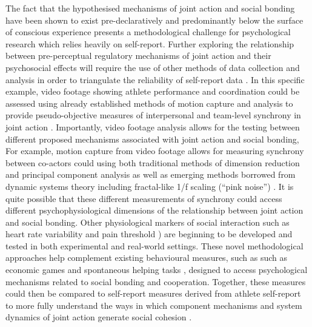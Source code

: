 \begin{landscape}
  The fact that the hypothesised mechanisms of joint action and social bonding have been shown to exist pre-declaratively and predominantly below the surface of conscious experience presents a methodological challenge for psychological research which relies heavily on self-report.  Further exploring the relationship between pre-perceptual regulatory mechanisms of joint action and their psychosocial effects will require the use of other methods of data collection and analysis in order to triangulate the reliability of self-report data \citep{Newell2014}.  In this specific example, video footage showing athlete performance and coordination could be assessed using already established methods of motion capture and analysis to provide pseudo-objective measures of interpersonal and team-level synchrony in joint action \citep[e.g.][]{Passos2011}.
  Importantly, video footage analysis allows for the testing between different proposed mechanisms associated with joint action and social bonding,  For example, motion capture from video footage allows for measuring synchrony between co-actors could using both traditional methods of dimension reduction and principal component analysis \citep[see for example][]{Riley2011} as well as emerging methods borrowed from dynamic systems theory including fractal-like 1/f scaling (``pink noise'') \citep[see for example][]{Holden2013}. It is quite possible that these different measurements of synchrony could access different psychophysiological dimensions of the relationship between joint action and social bonding.  Other physiological markers of social interaction such as heart rate variability \citep{Konvalinka2011,Fischer2014a} and pain threshold \citep{Cohen2009,Tarr2015}) are beginning to be developed and tested in both experimental and real-world settings.
  These novel methodological approaches help complement existing behavioural measures, such as such as economic games \citep{Xygalatas2013} and spontaneous helping tasks \citep{Kirschner2010}, designed to access psychological mechanisms related to social bonding and cooperation.
  Together, these measures could then be compared to self-report measures derived from athlete self-report to more fully understand the ways in which component mechanisms and system dynamics of joint action generate social cohesion \citep{Marsh2009}.


\end{landscape}
